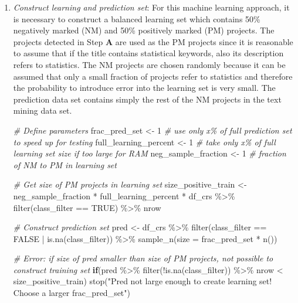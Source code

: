 \documentclass[
]{article}
\newenvironment{Shaded}{\begin{snugshade}}{\end{snugshade}}
\newcommand{\AttributeTok}[1]{\textcolor[rgb]{0.77,0.63,0.00}{#1}}
\newcommand{\CommentTok}[1]{\textcolor[rgb]{0.56,0.35,0.01}{\textit{#1}}}
\newcommand{\ConstantTok}[1]{\textcolor[rgb]{0.00,0.00,0.00}{#1}}
\newcommand{\ControlFlowTok}[1]{\textcolor[rgb]{0.13,0.29,0.53}{\textbf{#1}}}
\newcommand{\DecValTok}[1]{\textcolor[rgb]{0.00,0.00,0.81}{#1}}
\newcommand{\FunctionTok}[1]{\textcolor[rgb]{0.00,0.00,0.00}{#1}}
\newcommand{\NormalTok}[1]{#1}
\newcommand{\OtherTok}[1]{\textcolor[rgb]{0.56,0.35,0.01}{#1}}
\newcommand{\SpecialCharTok}[1]{\textcolor[rgb]{0.00,0.00,0.00}{#1}}
\newcommand{\StringTok}[1]{\textcolor[rgb]{0.31,0.60,0.02}{#1}}
\begin{document}
\begin{enumerate}
  \begin{enumerate}
  \def\labelenumii{\roman{enumii}.}
  \item
    \emph{Construct learning and prediction set}: For this machine learning approach, it is necessary to construct a balanced learning set which contains 50\% negatively marked (NM) and 50\% positively marked (PM) projects. The projects detected in Step \textbf{A} are used as the PM projects since it is reasonable to assume that if the title contains statistical keywords, also its description refers to statistics. The NM projects are chosen randomly because it can be assumed that only a small fraction of projects refer to statistics and therefore the probability to introduce error into the learning set is very small. The prediction data set contains simply the rest of the NM projects in the text mining data set.

\begin{Shaded}
\begin{Highlighting}[]
\CommentTok{\# Define parameters }
\NormalTok{frac\_pred\_set }\OtherTok{\textless{}{-}} \DecValTok{1}             \CommentTok{\# use only x\% of full prediction set to speed up for testing}
\NormalTok{full\_learning\_percent }\OtherTok{\textless{}{-}} \DecValTok{1}     \CommentTok{\# take only x\% of full learning set size if too large for RAM}
\NormalTok{neg\_sample\_fraction }\OtherTok{\textless{}{-}} \DecValTok{1}       \CommentTok{\# fraction of NM to PM in learning set}

\CommentTok{\# Get size of PM projects in learning set}
\NormalTok{size\_positive\_train }\OtherTok{\textless{}{-}}\NormalTok{ neg\_sample\_fraction }\SpecialCharTok{*}\NormalTok{ full\_learning\_percent }\SpecialCharTok{*}\NormalTok{ df\_crs }\SpecialCharTok{\%\textgreater{}\%} \FunctionTok{filter}\NormalTok{(class\_filter }\SpecialCharTok{==} \ConstantTok{TRUE}\NormalTok{) }\SpecialCharTok{\%\textgreater{}\%}\NormalTok{ nrow}

\CommentTok{\# Construct prediction set}
\NormalTok{pred }\OtherTok{\textless{}{-}}\NormalTok{ df\_crs }\SpecialCharTok{\%\textgreater{}\%}
  \FunctionTok{filter}\NormalTok{(class\_filter }\SpecialCharTok{==} \ConstantTok{FALSE} \SpecialCharTok{|} \FunctionTok{is.na}\NormalTok{(class\_filter)) }\SpecialCharTok{\%\textgreater{}\%}
  \FunctionTok{sample\_n}\NormalTok{(}\AttributeTok{size =}\NormalTok{ frac\_pred\_set }\SpecialCharTok{*} \FunctionTok{n}\NormalTok{())}

\CommentTok{\# Error: if size of pred smaller than size of PM projects, not possible to construct training set}
\ControlFlowTok{if}\NormalTok{(pred }\SpecialCharTok{\%\textgreater{}\%} \FunctionTok{filter}\NormalTok{(}\SpecialCharTok{!}\FunctionTok{is.na}\NormalTok{(class\_filter)) }\SpecialCharTok{\%\textgreater{}\%}\NormalTok{ nrow }\SpecialCharTok{\textless{}}\NormalTok{ size\_positive\_train) }\FunctionTok{stop}\NormalTok{(}\StringTok{"Pred not large enough to create learning set! Choose a larger frac\_pred\_set"}\NormalTok{)}


\end{Highlighting}
\end{Shaded}
\end{enumerate}
\end{enumerate}
\end{document}
